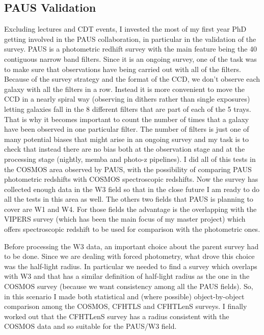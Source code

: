\documentclass[11pt]{article}
\begin{document}
\subsection{PAUS Validation} 
\label{sub:PAU_val}
Excluding lectures and CDT events, I invested the most of my first year PhD getting involved in the PAUS collaboration, in particular in the validation of the survey. PAUS is a photometric redhift survey with the main feature being the 40 contiguous narrow band filters. Since it is an ongoing survey, one of the task was to make sure that observations have being carried out with all of the filters. Because of the survey strategy and the format of the CCD, we don't observe each galaxy with all the filters in a row. Instead it is more convenient to move the CCD in a nearly spiral way (observing in dithers rather than single exposures) letting galaxies fall in the 8 different filters that are part of each of the 5 trays. That is why it becomes important to count the number of times that a galaxy have been observed in one particular filter. The number of filters is just one of many potential biases that might arise in an ongoing survey and my task is to check that instead there are no bias both at the observation stage and at the processing stage  (nightly, memba and photo-z pipelines). I did all of this tests in the COSMOS area observed by PAUS, with the possibility of comparing PAUS photometric redshifts with COSMOS spectroscopic redshifts. Now the survey has collected enough data in the W3 field so that in the close future I am ready to do all the tests in this area as well. The others two fields that PAUS is planning to cover are W1 and W4. For those fields the advantage is the overlapping with the VIPERS survey (which has been the main focus of my master project) which offers spectroscopic redshift to be used for comparison with the photometric ones. 

Before processing the W3 data, an important choice about the parent survey had to be done. Since we are dealing with forced photometry, what drove this choice was the half-light radius. In particular we needed to find a survey which overlaps with W3 and that has a similar definition of half-light radius as the one in the COSMOS survey (because we want consistency among all the PAUS fields). So, in this scenario I made both statistical and (where possible) object-by-object comparison among the COSMOS, CFHTLS and CFHTLenS surveys. I finally worked out that the CFHTLenS survey has a radius consistent with the COSMOS data and so suitable for the PAUS/W3 field.
\end{document}
